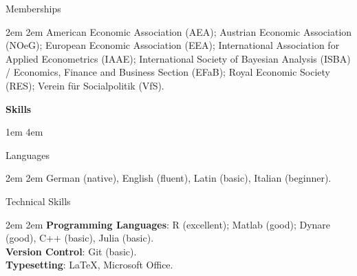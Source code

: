 \documentclass{resume} %
\begin{document}
\vspace{0.2cm}
{\large Memberships}
\par \begingroup \leftskip2em \rightskip2em \vspace{-0.2cm}
    American Economic Association (AEA); Austrian Economic Association (NOeG); European Economic Association (EEA); International Association for Applied Econometrics (IAAE); International Society of Bayesian Analysis (ISBA) / Economics, Finance and Business Section (EFaB); Royal Economic Society (RES); Verein f\"{u}r Socialpolitik (VfS).
\par \endgroup
\par \endgroup

\clearpage
\vspace{0.5cm}
{\textbf{\large  Skills}}
\par \begingroup \leftskip1em \rightskip4em

\vspace{0.2cm}
{\large Languages}
\par \begingroup \leftskip2em \rightskip2em \vspace*{-0.2cm}
    German (native), English (fluent), Latin (basic), Italian (beginner).
\par \endgroup

\vspace{0.2cm}
{\large Technical Skills}
\par \begingroup \leftskip2em \rightskip2em \vspace*{-0.2cm}
    \textbf{Programming Languages}: R (excellent); Matlab (good); Dynare (good), C++ (basic), Julia (basic). \\
    \textbf{Version Control}: Git (basic). \\
    \textbf{Typesetting}: \LaTeX, Microsoft Office.
\par \endgroup

\par \endgroup



\end{document}

